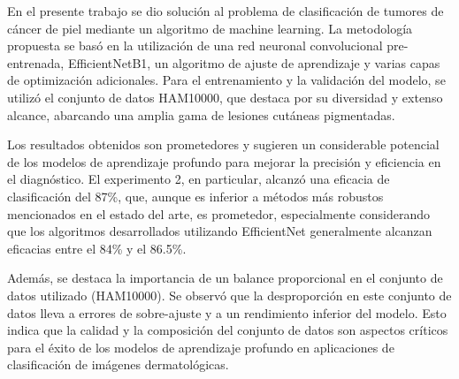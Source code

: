 \begin{conclusions}
En el presente trabajo se dio solución al problema de clasificación de tumores de cáncer de piel mediante un algoritmo de machine learning. La metodología propuesta se basó en la utilización de una red neuronal convolucional pre-entrenada, EfficientNetB1, un algoritmo de ajuste de aprendizaje y varias capas de optimización adicionales. Para el entrenamiento y la validación del modelo, se utilizó el conjunto de datos HAM10000, que destaca por su diversidad y extenso alcance, abarcando una amplia gama de lesiones cutáneas pigmentadas.

Los resultados obtenidos son prometedores y sugieren un considerable potencial de los modelos de aprendizaje profundo para mejorar la precisión y eficiencia en el diagnóstico. El experimento 2, en particular, alcanzó una eficacia de clasificación del 87\%, que, aunque es inferior a métodos más robustos mencionados en el estado del arte, es prometedor, especialmente considerando que los algoritmos desarrollados utilizando EfficientNet generalmente alcanzan eficacias entre el 84\% y el 86.5\%.

Además, se destaca la importancia de un balance proporcional en el conjunto de datos utilizado (HAM10000). Se observó que la desproporción en este conjunto de datos lleva a errores de sobre-ajuste y a un rendimiento inferior del modelo. Esto indica que la calidad y la composición del conjunto de datos son aspectos críticos para el éxito de los modelos de aprendizaje profundo en aplicaciones de clasificación de imágenes dermatológicas.
\end{conclusions}
